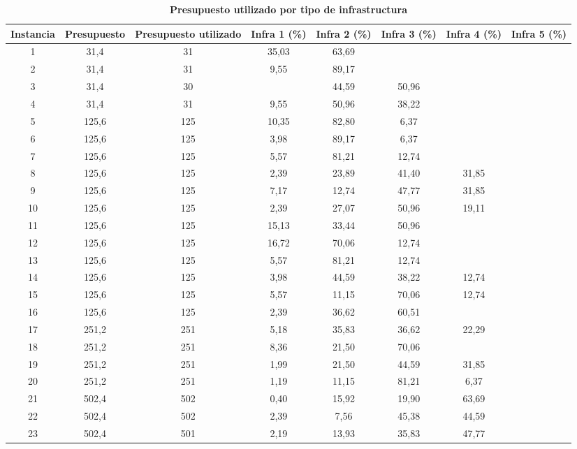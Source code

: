 \documentclass{article}
\begin{document}
  \begin{table}
    \centering
    \caption*{{\bf Presupuesto utilizado por tipo de infrastructura}}
    \begin{tabular}{cccccccc}
        \toprule
        Instancia & Presupuesto & Presupuesto utilizado & Infra 1 (\%) & Infra 2 (\%) & Infra 3 (\%) & Infra 4 (\%) & Infra 5 (\%) \\
        \midrule
        1 & 31,4 & 31 & 35,03 & 63,69 &  &  &  \\
        2 & 31,4 & 31 & 9,55 & 89,17 &  &  &  \\
        3 & 31,4 & 30 &  & 44,59 & 50,96 &  &  \\
        4 & 31,4 & 31 & 9,55 & 50,96 & 38,22 &  &  \\
        5 & 125,6 & 125 & 10,35 & 82,80 & 6,37 &  &  \\
        6 & 125,6 & 125 & 3,98 & 89,17 & 6,37 &  &  \\
        7 & 125,6 & 125 & 5,57 & 81,21 & 12,74 &  &  \\
        8 & 125,6 & 125 & 2,39 & 23,89 & 41,40 & 31,85 &  \\
        9 & 125,6 & 125 & 7,17 & 12,74 & 47,77 & 31,85 &  \\
        10 & 125,6 & 125 & 2,39 & 27,07 & 50,96 & 19,11 &  \\
        11 & 125,6 & 125 & 15,13 & 33,44 & 50,96 &  &  \\
        12 & 125,6 & 125 & 16,72 & 70,06 & 12,74 &  &  \\
        13 & 125,6 & 125 & 5,57 & 81,21 & 12,74 &  &  \\
        14 & 125,6 & 125 & 3,98 & 44,59 & 38,22 & 12,74 &  \\
        15 & 125,6 & 125 & 5,57 & 11,15 & 70,06 & 12,74 &  \\
        16 & 125,6 & 125 & 2,39 & 36,62 & 60,51 &  &  \\
        17 & 251,2 & 251 & 5,18 & 35,83 & 36,62 & 22,29 &  \\
        18 & 251,2 & 251 & 8,36 & 21,50 & 70,06 &  &  \\
        19 & 251,2 & 251 & 1,99 & 21,50 & 44,59 & 31,85 &  \\
        20 & 251,2 & 251 & 1,19 & 11,15 & 81,21 & 6,37 &  \\
        21 & 502,4 & 502 & 0,40 & 15,92 & 19,90 & 63,69 &  \\
        22 & 502,4 & 502 & 2,39 & 7,56 & 45,38 & 44,59 &  \\
        23 & 502,4 & 501 & 2,19 & 13,93 & 35,83 & 47,77 &  \\

\end{tabular}
\end{table}
\end{document}
